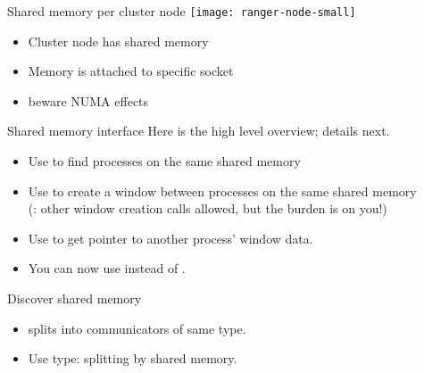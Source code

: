 \begin{numberedframe}{Shared memory per cluster node}
  \texttt{[image: ranger-node-small]}
  \begin{itemize}
  \item Cluster node has shared memory
  \item Memory is attached to specific socket
  \item beware \ac{NUMA} effects
  \end{itemize}
\end{numberedframe}

\begin{numberedframe}{Shared memory interface}
  Here is the high level overview; details next.
  \begin{itemize}
  \item Use  to find processes on the same
    shared memory
  \item Use  to create a window between
    processes on the same shared memory\\
    (: other window creation calls allowed, but the burden is on you!)
  \item Use  to get pointer to another
    process' window data.
  \item You can now use  instead of .
  \end{itemize}
\end{numberedframe}

\begin{numberedframe}{Discover shared memory}
  \begin{itemize}
  \item
     splits into communicators of same type.
  \item Use type:  splitting by
    shared memory.
  \end{itemize}

  { 
    \renewcommand\snippetcodefraction{.4}
    \renewcommand\snippetlistfraction{.55}
    \renewcommand\snippetoutputsize{\scriptsize}
    }
\end{numberedframe}

\begin{exerciseframe}[shareddata]
  
\end{exerciseframe}

